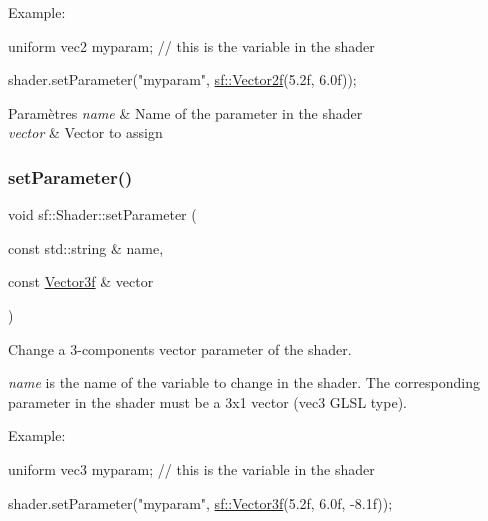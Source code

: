 Example\+: 
\begin{DoxyCode}
uniform vec2 myparam; \textcolor{comment}{// this is the variable in the shader}
\end{DoxyCode}
 
\begin{DoxyCode}
shader.setParameter(\textcolor{stringliteral}{"myparam"}, \hyperlink{classsf_1_1Vector2}{sf::Vector2f}(5.2f, 6.0f));
\end{DoxyCode}



\begin{DoxyParams}{Paramètres}
{\em name} & Name of the parameter in the shader \\
\hline
{\em vector} & Vector to assign \\
\hline
\end{DoxyParams}
\mbox{\label{classsf_1_1Shader_a87d4a0c6dc70ae68aecc0dda3f343c07}} 
\subsubsection{\texorpdfstring{set\+Parameter()}{setParameter()}\hspace{0.1cm}{\footnotesize\ttfamily [6/10]}}
{\footnotesize\ttfamily void sf\+::\+Shader\+::set\+Parameter (\begin{DoxyParamCaption}\item[{const std\+::string \&}]{name,  }\item[{const \hyperlink{classsf_1_1Vector3}{Vector3f} \&}]{vector }\end{DoxyParamCaption})}



Change a 3-\/components vector parameter of the shader. 

{\itshape name} is the name of the variable to change in the shader. The corresponding parameter in the shader must be a 3x1 vector (vec3 G\+L\+SL type).

Example\+: 
\begin{DoxyCode}
uniform vec3 myparam; \textcolor{comment}{// this is the variable in the shader}
\end{DoxyCode}
 
\begin{DoxyCode}
shader.setParameter(\textcolor{stringliteral}{"myparam"}, \hyperlink{classsf_1_1Vector3}{sf::Vector3f}(5.2f, 6.0f, -8.1f));
\end{DoxyCode}



